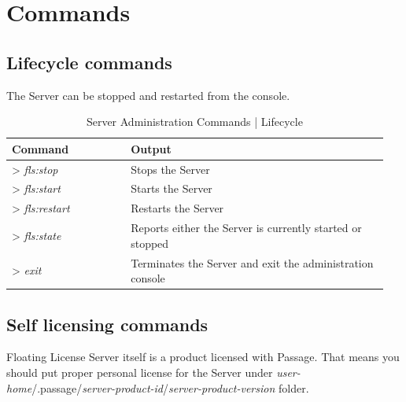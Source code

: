 \documentclass[12pt]{report}
\begin{document}
\section*{Commands} \label{ch:run-fls-commands}

\subsection*{Lifecycle commands} \label{ch:run-fls-commands-lc}
 
The Server can be stopped and restarted from the console. 

\begin{table}[h!t]
\caption{Server Administration Commands | Lifecycle}
\label{tabular:server-commands-lc}
\begin{center}
	\begin{tabular}{p{0.3\linewidth}p{0.65\linewidth}}
		\textbf{Command} & \textbf{Output} \\  \hline
		\textgreater \textit{ fls:stop} & Stops the Server\\  \hline
		\textgreater \textit{ fls:start} & Starts the Server\\  \hline
		\textgreater \textit{ fls:restart} & Restarts the Server\\  \hline
		\textgreater \textit{ fls:state} & Reports either the Server is currently started or stopped\\ \hline
		\textgreater \textit{ exit} & Terminates the Server and exit the administration console\\ \hline
	\end{tabular}
\end{center}
\end{table}

\subsection*{Self licensing commands} \label{ch:run-fls-commands-lc}

Floating License Server itself is a product licensed with Passage. 
That means you should put proper personal license for the Server under 
\textit{user-home}/.passage/\textit{server-product-id}/\textit{server-product-version} folder.
\end{document}
